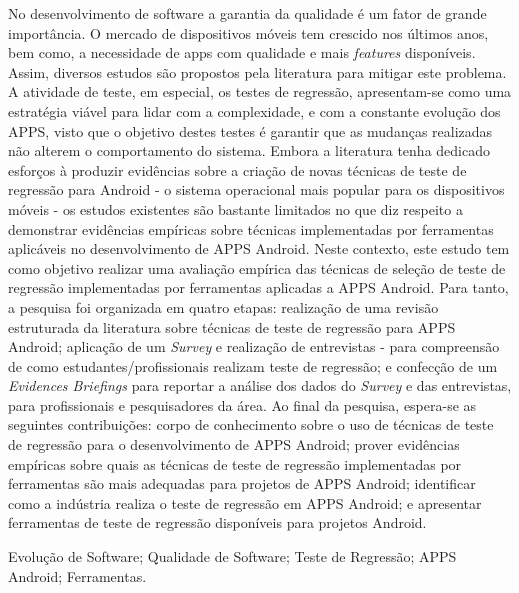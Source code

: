 
\resumo


No desenvolvimento de software a garantia da qualidade é um fator de grande importância. O mercado de dispositivos móveis tem crescido nos últimos anos, bem como, a necessidade de apps com qualidade e mais \textit{features} disponíveis. Assim, diversos estudos são propostos pela literatura para mitigar este problema. A atividade de teste, em especial, os testes de regressão, apresentam-se como uma estratégia viável para lidar com a complexidade, e com a constante evolução dos \ac{APPS}, visto que o objetivo destes testes é garantir que as mudanças realizadas não alterem o comportamento do sistema. Embora a literatura tenha dedicado esforços à produzir evidências sobre a criação de novas técnicas de teste de regressão para Android - o sistema operacional mais popular para os dispositivos móveis - os estudos existentes são bastante limitados no que diz respeito a demonstrar evidências empíricas sobre técnicas implementadas por ferramentas aplicáveis no desenvolvimento de \ac{APPS} Android. Neste contexto, este estudo tem como objetivo realizar uma avaliação empírica das técnicas de seleção de teste de regressão implementadas por ferramentas aplicadas a \ac{APPS} Android. Para tanto, a pesquisa foi organizada em quatro etapas: realização de uma revisão estruturada da literatura sobre técnicas de teste de regressão para \ac{APPS} Android; aplicação de um \textit{Survey} e realização de entrevistas - para compreensão de como estudantes/profissionais realizam teste de regressão; e confecção de um \textit{Evidences Briefings} para reportar a análise dos dados do \textit{Survey} e das entrevistas, para profissionais e pesquisadores da área. Ao final da pesquisa, espera-se as seguintes contribuições: corpo de conhecimento sobre o uso de técnicas de teste de regressão para o desenvolvimento de \ac {APPS} Android; prover evidências empíricas sobre quais as técnicas de teste de regressão implementadas por ferramentas são mais adequadas para projetos de \ac{APPS} Android; identificar como a indústria realiza o teste de regressão em \ac{APPS} Android; e apresentar ferramentas de teste de regressão disponíveis para projetos Android.



\begin{keywords}
Evolução de Software; Qualidade de Software; Teste de Regressão; APPS Android; Ferramentas.
\end{keywords}

